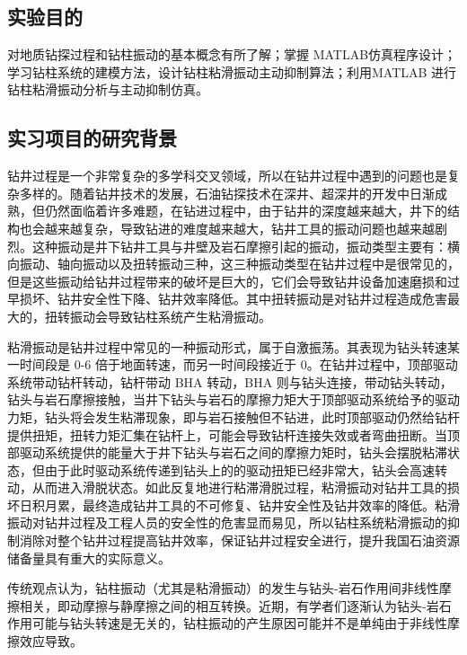 \documentclass[12pt,hyperref,a4paper,UTF8]{ctexart}
\begin{document}
	
	
	\subsection{实验目的}
	对地质钻探过程和钻柱振动的基本概念有所了解；掌握 MATLAB仿真程序设计；学习钻柱系统的建模方法，设计钻柱粘滑振动主动抑制算法；利用MATLAB 进行钻柱粘滑振动分析与主动抑制仿真。
	\subsection{实习项目的研究背景}
	钻井过程是一个非常复杂的多学科交叉领域，所以在钻井过程中遇到的问题也是复杂多样的。随着钻井技术的发展，石油钻探技术在深井、超深井的开发中日渐成熟，但仍然面临着许多难题，在钻进过程中，由于钻井的深度越来越大，井下的结构也会越来越复杂，导致钻进的难度越来越大，钻井工具的振动问题也越来越剧烈。这种振动是井下钻井工具与井壁及岩石摩擦引起的振动，振动类型主要有：横向振动、轴向振动以及扭转振动三种，这三种振动类型在钻井过程中是很常见的，但是这些振动给钻井过程带来的破坏是巨大的，它们会导致钻井设备加速磨损和过早损坏、钻井安全性下降、钻井效率降低。其中扭转振动是对钻井过程造成危害最大的，扭转振动会导致钻柱系统产生粘滑振动\cite{付蒙}。
	
	粘滑振动是钻井过程中常见的一种振动形式，属于自激振荡。其表现为钻头转速某一时间段是 0-6 倍于地面转速，而另一时间段接近于 0。在钻井过程中，顶部驱动系统带动钻杆转动，钻杆带动 BHA 转动，BHA 则与钻头连接，带动钻头转动，钻头与岩石摩擦接触，当井下钻头与岩石的摩擦力矩大于顶部驱动系统给予的驱动力矩，钻头将会发生粘滞现象，即与岩石接触但不钻进，此时顶部驱动仍然给钻杆提供扭矩，扭转力矩汇集在钻杆上，可能会导致钻杆连接失效或者弯曲扭断。当顶部驱动系统提供的能量大于井下钻头与岩石之间的摩擦力矩时，钻头会摆脱粘滞状态，但由于此时驱动系统传递到钻头上的的驱动扭矩已经非常大，钻头会高速转动，从而进入滑脱状态。如此反复地进行粘滞滑脱过程，粘滑振动对钻井工具的损坏日积月累，最终造成钻井工具的不可修复、钻井安全性及钻井效率的降低。粘滑振动对钻井过程及工程人员的安全性的危害显而易见，所以钻柱系统粘滑振动的抑制消除对整个钻井过程提高钻井效率，保证钻井过程安全进行，提升我国石油资源储备量具有重大的实际意义\cite{吴永强}。
	
	传统观点认为，钻柱振动（尤其是粘滑振动）的发生与钻头-岩石作用间非线性摩擦相关，即动摩擦与静摩擦之间的相互转换。近期，有学者们逐渐认为钻头-岩石作用可能与钻头转速是无关的，钻柱振动的产生原因可能并不是单纯由于非线性摩擦效应导致。
	

	
\end{document}
